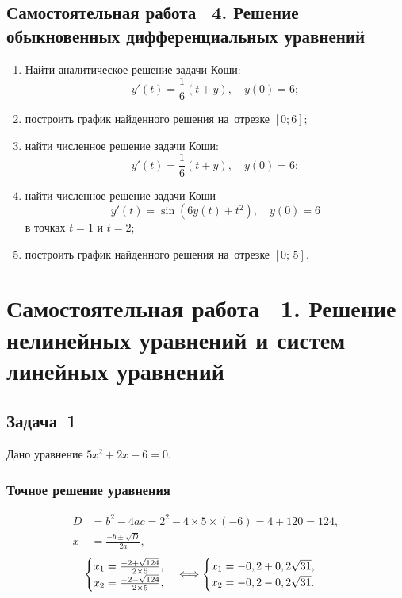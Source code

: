 \documentclass[10pt, a4paper, titlepage, oneside]{article}
\begin{document}
\subsection*{Самостоятельная работа \textnumero~4. Решение обыкновенных дифференциальных уравнений}

\begin{enumerate}
    \item Найти аналитическое решение задачи Коши: $$y'(t)=\frac{1}{6}(t+y), \quad y(0)=6 ;$$
    \item построить график найденного решения на~отрезке $[0; 6]$;
    \item найти численное решение задачи Коши: $$y'(t)=\frac{1}{6}(t+y), \quad y(0)=6 ;$$
    \item найти численное решение задачи Коши $$y'(t)=\sin(6y(t)+t^2), \quad y(0)=6$$ в точках $t=1$ и $t=2$;
    \item построить график найденного решения на~отрезке $[0;\,5]$.
\end{enumerate}

\clearpage
\section{Самостоятельная работа \textnumero~1. Решение нелинейных уравнений и систем линейных уравнений}

\subsection{Задача~1}

Дано уравнение $5x^2+2x-6=0$.

\subsubsection*{Точное решение уравнения}

\begin{align*}
D &= b^2-4ac=2^2-4\times5\times(-6)=4+120=124, \\
x &= \frac{-b\pm\sqrt{D}}{2a},
\end{align*}
\begin{equation*}
    \begin{cases}
        $$x_1=\frac{-2+\sqrt{124}}{2\times5}$$, \\
        $$x_2=\frac{-2-\sqrt{124}}{2\times5}$$,
    \end{cases}
    \Longleftrightarrow
    \begin{cases}
        $$x_1=-0,2+0,2\sqrt{31}$$, \\
        $$x_2=-0,2-0,2\sqrt{31}$$.
    \end{cases}
\end{equation*} 
\end{document}

